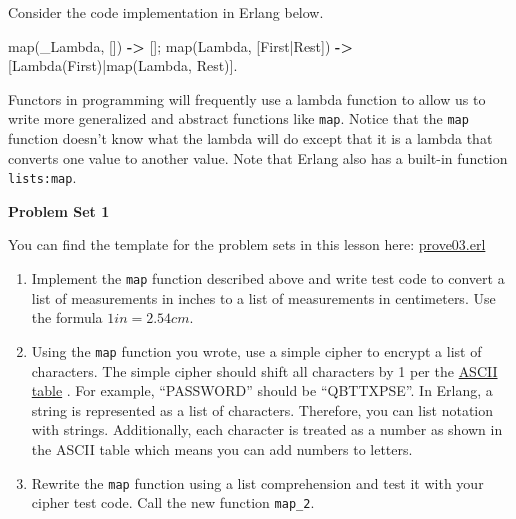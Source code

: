 \documentclass[
]{book}
\newenvironment{Shaded}{\begin{snugshade}}{\end{snugshade}}
\newcommand{\FunctionTok}[1]{\textcolor[rgb]{0.00,0.00,0.00}{#1}}
\newcommand{\OperatorTok}[1]{\textcolor[rgb]{0.81,0.36,0.00}{\textbf{#1}}}
\newcommand{\VariableTok}[1]{\textcolor[rgb]{0.00,0.00,0.00}{#1}}
\providecommand{\tightlist}{%
  \setlength{\itemsep}{0pt}\setlength{\parskip}{0pt}}
\begin{document}
Consider the code implementation in Erlang below.

\begin{Shaded}
\begin{Highlighting}[]
\FunctionTok{map(}\VariableTok{\_Lambda}\FunctionTok{,} \FunctionTok{[])} \OperatorTok{{-}\textgreater{}} \FunctionTok{[];}
\FunctionTok{map(}\VariableTok{Lambda}\FunctionTok{,} \FunctionTok{[}\VariableTok{First}\FunctionTok{|}\VariableTok{Rest}\FunctionTok{])} \OperatorTok{{-}\textgreater{}} \FunctionTok{[}\VariableTok{Lambda}\FunctionTok{(}\VariableTok{First}\FunctionTok{)|map(}\VariableTok{Lambda}\FunctionTok{,} \VariableTok{Rest}\FunctionTok{)].}
\end{Highlighting}
\end{Shaded}

Functors in programming will frequently use a lambda function to allow us to write more generalized and abstract functions like \texttt{map}. Notice that the \texttt{map} function doesn't know what the lambda will do except that it is a lambda that converts one value to another value. Note that Erlang also has a built-in function \texttt{lists:map}.

\begin{problembox}

\textbf{Problem Set 1}

You can find the template for the problem sets in this lesson here: \href{proves/prove03.erl}{prove03.erl}

\begin{enumerate}
\def\labelenumi{\arabic{enumi}.}
\tightlist
\item
  Implement the \texttt{map} function described above and write test code to convert a list of measurements in inches to a list of measurements in centimeters. Use the formula \(1 in = 2.54 cm.\)
\item
  Using the \texttt{map} function you wrote, use a simple cipher to encrypt a list of characters. The simple cipher should shift all characters by 1 per the \href{https://www.asciitable.com/}{ASCII table} . For example, ``PASSWORD'' should be ``QBTTXPSE''. In Erlang, a string is represented as a list of characters. Therefore, you can list notation with strings. Additionally, each character is treated as a number as shown in the ASCII table which means you can add numbers to letters.
\item
  Rewrite the \texttt{map} function using a list comprehension and test it with your cipher test code. Call the new function \texttt{map\_2}.
\end{enumerate}

\end{problembox}
\end{document}
